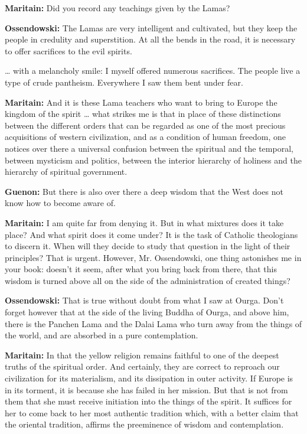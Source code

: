 \textbf{Maritain:} Did you record any teachings given by the Lamas?

\textbf{Ossendowski:} The Lamas are very intelligent and cultivated, but they keep the people in credulity and superstition. At all the bends in the road, it is necessary to offer sacrifices to the evil spirits.

… with a melancholy smile: I myself offered numerous sacrifices. The people live a type of crude pantheism. Everywhere I saw them bent under fear.

\textbf{Maritain:} And it is these Lama teachers who want to bring to Europe the kingdom of the spirit … what strikes me is that in place of these distinctions between the different orders that can be regarded as one of the most precious acquisitions of western civilization, and as a condition of human freedom, one notices over there a universal confusion between the spiritual and the temporal, between mysticism and politics, between the interior hierarchy of holiness and the hierarchy of spiritual government.

\textbf{Guenon:} But there is also over there a deep wisdom that the West does not know how to become aware of.

\textbf{Maritain:} I am quite far from denying it. But in what mixtures does it take place? And what spirit does it come under? It is the task of Catholic theologians to discern it. When will they decide to study that question in the light of their principles? That is urgent. However, Mr. Ossendowski, one thing astonishes me in your book: doesn't it seem, after what you bring back from there, that this wisdom is turned above all on the side of the administration of created things?

\textbf{Ossendowski:} That is true without doubt from what I saw at Ourga. Don't forget however that at the side of the living Buddha of Ourga, and above him, there is the Panchen Lama and the Dalai Lama who turn away from the things of the world, and are absorbed in a pure contemplation.

\textbf{Maritain:} In that the yellow religion remains faithful to one of the deepest truths of the spiritual order. And certainly, they are correct to reproach our civilization for its materialism, and its dissipation in outer activity. If Europe is in its torment, it is because she has failed in her mission. But that is not from them that she must receive initiation into the things of the spirit. It suffices for her to come back to her most authentic tradition which, with a better claim that the oriental tradition, affirms the preeminence of wisdom and contemplation.


